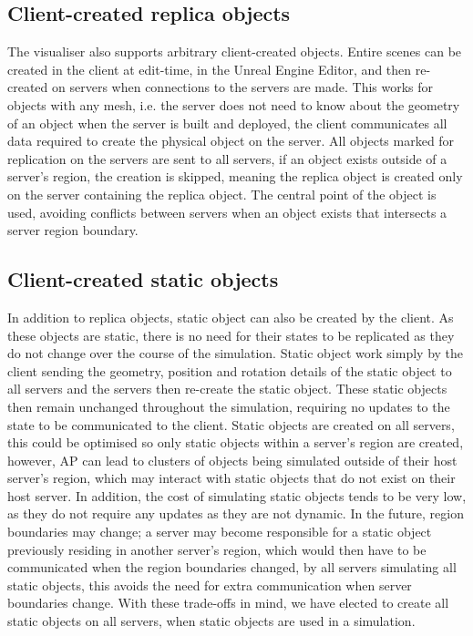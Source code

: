 \subsection{Client-created replica objects}
The visualiser also supports arbitrary client-created objects. Entire scenes can be created in the client at edit-time, in the Unreal Engine Editor, and then re-created on servers when connections to the servers are made. This works for objects with any mesh, i.e. the server does not need to know about the geometry of an object when the server is built and deployed, the client communicates all data required to create the physical object on the server. All objects marked for replication on the servers are sent to all servers, if an object exists outside of a server's region, the creation is skipped, meaning the replica object is created only on the server containing the replica object. The central point of the object is used, avoiding conflicts between servers when an object exists that intersects a server region boundary.

\subsection{Client-created static objects}
In addition to replica objects, static object can also be created by the client. As these objects are static, there is no need for their states to be replicated as they do not change over the course of the simulation. Static object work simply by the client sending the geometry, position and rotation details of the static object to all servers and the servers then re-create the static object. These static objects then remain unchanged throughout the simulation, requiring no updates to the state to be communicated to the client. Static objects are created on all servers, this could be optimised so only static objects within a server's region are created, however, AP can lead to clusters of objects being simulated outside of their host server's region, which may interact with static objects that do not exist on their host server. In addition, the cost of simulating static objects tends to be very low, as they do not require any updates as they are not dynamic. In the future, region boundaries may change; a server may become responsible for a static object previously residing in another server's region, which would then have to be communicated when the region boundaries changed, by all servers simulating all static objects, this avoids the need for extra communication when server boundaries change. With these trade-offs in mind, we have elected to create all static objects on all servers, when static objects are used in a simulation.

